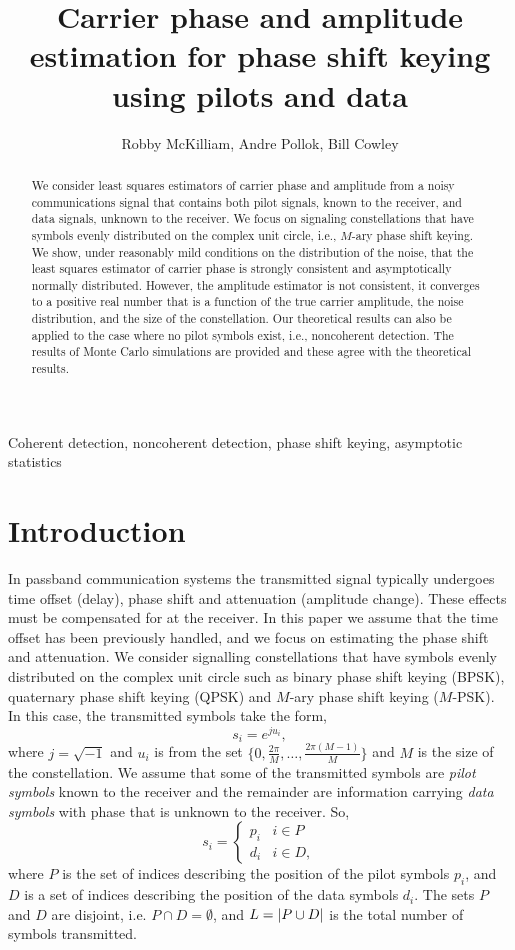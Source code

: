 \documentclass[journal]{IEEEtran}
\title{Carrier phase and amplitude estimation for phase shift keying using pilots and data}
\author{Robby McKilliam, Andre Pollok, Bill Cowley}
\begin{document}
\maketitle

\begin{abstract}
We consider least squares estimators of carrier phase and amplitude from a noisy communications signal that contains both pilot signals, known to the receiver, and data signals, unknown to the receiver.  We focus on signaling constellations that have symbols evenly distributed on the complex unit circle, i.e., $M$-ary phase shift keying.  We show, under reasonably mild conditions on the distribution of the noise, that the least squares estimator of carrier phase is strongly consistent and asymptotically normally distributed.  However, the amplitude estimator is not consistent, it converges to a positive real number that is a function of the true carrier amplitude, the noise distribution, and the size of the constellation.  Our theoretical results can also be applied to the case where no pilot symbols exist, i.e., noncoherent detection.  The results of Monte Carlo simulations are provided and these agree with the theoretical results.   
\end{abstract}
\begin{IEEEkeywords}
Coherent detection, noncoherent detection, phase shift keying, asymptotic statistics
\end{IEEEkeywords}

\section{Introduction}

In passband communication systems the transmitted signal typically undergoes time offset (delay), phase shift and attenuation (amplitude change).  These effects must be compensated for at the receiver. In this paper we assume that the time offset has been previously handled, and we focus on estimating the phase shift and attenuation.  We consider signalling constellations that have symbols evenly distributed on the complex unit circle such as binary phase shift keying (BPSK), quaternary phase shift keying (QPSK) and $M$-ary phase shift keying ($M$-PSK).  In this case, the transmitted symbols take the form,
\[
s_i = e^{j u_i},
\]
where $j = \sqrt{-1}$ and $u_i$ is from the set $\{0, \tfrac{2\pi}{M}, \dots, \tfrac{2\pi(M-1)}{M}\}$ and $M$ is the size of the constellation.  We assume that some of the transmitted symbols are \emph{pilot symbols} known to the receiver and the remainder are information carrying \emph{data symbols} with phase that is unknown to the receiver.  So,
\[
s_i = \begin{cases}
p_i & i \in P \\
d_i & i \in D,
\end{cases}
\]
where $P$ is the set of indices describing the position of the pilot symbols $p_i$, and $D$ is a set of indices describing the position of the data symbols $d_i$.  The sets $P$ and $D$ are disjoint, i.e. $P \cap D = \emptyset$, and $L = {\left\vert P \cup D \right\vert}$ is the total number of symbols transmitted.
\end{document}
